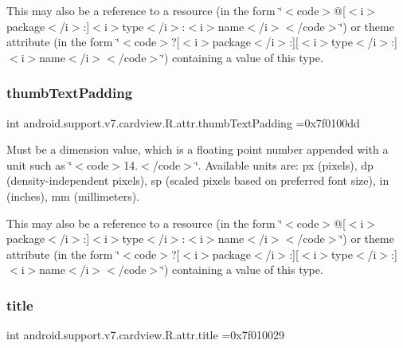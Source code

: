 This may also be a reference to a resource (in the form \char`\"{}$<$code$>$@\mbox{[}$<$i$>$package$<$/i$>$\+:\mbox{]}$<$i$>$type$<$/i$>$\+:$<$i$>$name$<$/i$>$$<$/code$>$\char`\"{}) or theme attribute (in the form \char`\"{}$<$code$>$?\mbox{[}$<$i$>$package$<$/i$>$\+:\mbox{]}\mbox{[}$<$i$>$type$<$/i$>$\+:\mbox{]}$<$i$>$name$<$/i$>$$<$/code$>$\char`\"{}) containing a value of this type. \mbox{\label{classandroid_1_1support_1_1v7_1_1cardview_1_1R_1_1attr_abf506594cf166db51e2592071996565b}} 
\subsubsection{\texorpdfstring{thumb\+Text\+Padding}{thumbTextPadding}}
{\footnotesize\ttfamily int android.\+support.\+v7.\+cardview.\+R.\+attr.\+thumb\+Text\+Padding =0x7f0100dd\hspace{0.3cm}{\ttfamily [static]}}

Must be a dimension value, which is a floating point number appended with a unit such as \char`\"{}$<$code$>$14.\+5sp$<$/code$>$\char`\"{}. Available units are\+: px (pixels), dp (density-\/independent pixels), sp (scaled pixels based on preferred font size), in (inches), mm (millimeters). 

This may also be a reference to a resource (in the form \char`\"{}$<$code$>$@\mbox{[}$<$i$>$package$<$/i$>$\+:\mbox{]}$<$i$>$type$<$/i$>$\+:$<$i$>$name$<$/i$>$$<$/code$>$\char`\"{}) or theme attribute (in the form \char`\"{}$<$code$>$?\mbox{[}$<$i$>$package$<$/i$>$\+:\mbox{]}\mbox{[}$<$i$>$type$<$/i$>$\+:\mbox{]}$<$i$>$name$<$/i$>$$<$/code$>$\char`\"{}) containing a value of this type. \mbox{\label{classandroid_1_1support_1_1v7_1_1cardview_1_1R_1_1attr_a152f347649775e5aee3805c09dbbab39}} 
\subsubsection{\texorpdfstring{title}{title}}
{\footnotesize\ttfamily int android.\+support.\+v7.\+cardview.\+R.\+attr.\+title =0x7f010029\hspace{0.3cm}{\ttfamily [static]}}

